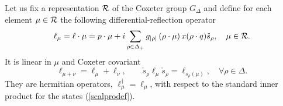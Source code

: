 \documentclass[a4paper,12pt]{article}
\begin{document}
Let us fix a representation \({\cal R}\) of the Coxeter group
\(G_{\Delta}\)
and define for each element \(\mu\in{\cal R}\) the following
differential-reflection operator
\begin{equation}
   \ell_{\mu}=\ell\cdot\mu=p\cdot\mu+i
   \sum_{\rho\in\Delta_{+}}g_{|\rho|}
   \,(\rho\cdot\mu)\,x(\rho\cdot q)\check{s}_{\rho},\quad \mu\in{\cal R}.
   \label{ldefs}
\end{equation}
It is linear in \(\mu\) and Coxeter covariant
\begin{equation}
   \ell_{\mu+\nu}=\ell_{\mu}+\ell_{\nu},\qquad
   \check{s}_{\rho}\ell_{\mu}\check{s}_{\rho}=\ell_{s_{\rho}(\mu)},\quad
   \forall \rho\in\Delta.
\end{equation}
They are hermitian operators, \(\ell_{\mu}^\dagger=\ell_{\mu}\),
with respect to
the standard inner product
for  the states (\ref{scalprodef}).
\end{document}

